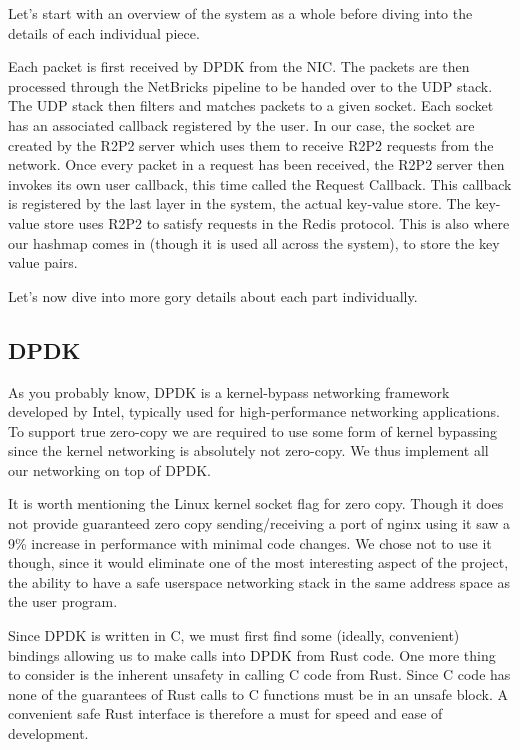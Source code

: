 \documentclass[11pt]{article}
\begin{document}
Let's start with an overview of the system as a whole before diving
into the details of each individual piece.

Each packet is first received by DPDK from the NIC. The packets are
then processed through the NetBricks pipeline to be handed over to the
UDP stack. The UDP stack then filters and matches packets to a given
socket. Each socket has an associated callback registered by the
user. In our case, the socket are created by the R2P2 server which
uses them to receive R2P2 requests from the network. Once every packet
in a request has been received, the R2P2 server then invokes its own
user callback, this time called the Request Callback. This callback
is registered by the last layer in the system, the actual key-value
store. The key-value store uses R2P2 to satisfy requests in the Redis
protocol. This is also where our hashmap comes in (though it is used
all across the system), to store the key value pairs.

Let's now dive into more gory details about each part individually.


\subsection{DPDK}

As you probably know, DPDK is a kernel-bypass networking framework
developed by Intel, typically used for high-performance networking
applications. To support true zero-copy we are required to use some
form of kernel bypassing since the kernel networking is absolutely
not zero-copy. We thus implement all our networking on top of DPDK.

It is worth mentioning the Linux kernel socket flag for zero copy.
Though it does not provide guaranteed zero copy sending/receiving a
port of nginx using it saw a 9\% increase in performance with minimal
code changes. We chose not to use it though, since it would eliminate
one of the most interesting aspect of the project, the ability to have
a safe userspace networking stack in the same address space as the
user program.

Since DPDK is written in C, we must first find some (ideally,
convenient) bindings allowing us to make calls into DPDK from Rust
code. One more thing to consider is the inherent unsafety in calling C
code from Rust. Since C code has none of the guarantees of Rust calls
to C functions must be in an unsafe block. A convenient safe Rust
interface is therefore a must for speed and ease of development.
\end{document}
